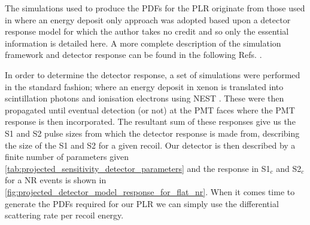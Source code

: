 The simulations used to produce the PDFs for the PLR originate from those used in \cite{LZ_projected_sensitivity_paper_ref} where an energy deposit only approach was adopted based upon a detector response model for which the author takes no credit and so only the essential information is detailed here.
A more complete description of the simulation framework and detector response can be found in the following Refs. \cite{lz_simulations_ref,theresafruth_thesis_ref}.
\par
In order to determine the detector response, a set of simulations were performed in the standard fashion; where an energy deposit in xenon is translated into scintillation photons and ionisation electrons using NEST \cite{nest_1_ref,nest_2_ref}.
These were then propagated until eventual detection (or not) at the PMT faces where the PMT response is then incorporated.
The resultant sum of these responses give us the S1 and S2 pulse sizes from which the detector response is made from, describing the size of the S1 and S2 for a given recoil.
Our detector is then described by a finite number of parameters given \autoref{tab:projected_sensitivity_detector_parameters} and the response in S1$_c$ and S2$_c$ for a NR events is shown in \autoref{fig:projected_detector_model_response_for_flat_nr}.
When it comes time to generate the PDFs required for our PLR we can simply use the differential scattering rate per recoil energy.


\iffalse
\begin{equation}
\begin{split}
    \mathcal{L}(\mu_s,\boldsymbol{\nu}) =& \text{Pois}(N | \mu_{tot}) \\
                                     &\times \prod^{n_0}_{e=1} \frac{1}{\mu_{tot}} \bigg(\mu_s f_s(\boldsymbol{x}_e)  + \sum^N_{b=1} \mu_b f_b(\boldsymbol{x}_e) \bigg) \\
                                     &\times \prod^{N}_{b=1} f_b (\mu_b | \nu_b )
\end{split}
\end{equation}
where $\mu_{tot}$ is the total background 


\begin{equation}
\begin{split}
    -2 \text{log}\mathcal{L}(\mu_s(\sigma),\textbf{\nu}) =& 2\bigg(\mu_s + \sum^{N}_{b=1} \mu_b \bigg) \\
                                                          &-2\sum^{n_0}_{e=1} \bigg(\text{log}(\mu_s f_s(x_e)  + \sum^N_{b=1}\mu_b f_b(x_e)
                                                          \bigg) \\
                                                          &+\sum^N_{b=1} \frac{(\mu_b - a_b)^2}{s^2_b}
\end{split}
\end{equation}

\fi
